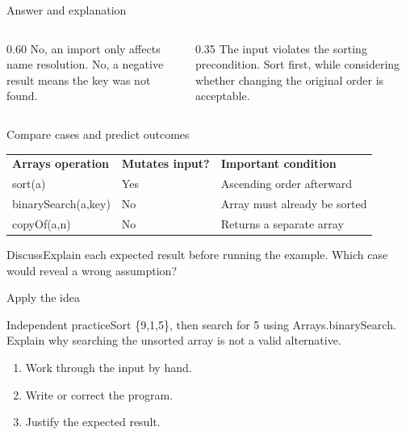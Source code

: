 \documentclass[10pt,aspectratio=169]{beamer}
\begin{document}
\begin{frame}[fragile,t]{Answer and explanation}
\begin{columns}[T,onlytextwidth]\begin{column}{0.60\textwidth}
No, an import only affects name resolution. No, a negative result means the key was not found.
\end{column}\begin{column}{0.35\textwidth}\small
The input violates the sorting precondition. Sort first, while considering whether changing the original order is acceptable.
\end{column}\end{columns}
\end{frame}


\begin{frame}[fragile,t]{Compare cases and predict outcomes}
\small\renewcommand{\arraystretch}{1.5}
\begin{tabularx}{\textwidth}{>{\raggedright\arraybackslash}X>{\raggedright\arraybackslash}X>{\raggedright\arraybackslash}X}\rowcolor{navy}
\color{white}\bfseries Arrays operation & \color{white}\bfseries Mutates input? & \color{white}\bfseries Important condition\\
sort(a) & Yes & Ascending order afterward\\
binarySearch(a,key) & No & Array must already be sorted\\
copyOf(a,n) & No & Returns a separate array\\
\end{tabularx}\par\vspace{3mm}\begin{exampleblock}{Discuss}Explain each expected result before running the example. Which case would reveal a wrong assumption?\end{exampleblock}
\end{frame}

\begin{frame}[fragile,t]{Apply the idea}
\begin{alertblock}{Independent practice}Sort \{9,1,5\}, then search for 5 using Arrays.binarySearch. Explain why searching the unsorted array is not a valid alternative.\end{alertblock}\vspace{3mm}\begin{enumerate}\item Work through the input by hand.\item Write or correct the program.\item Justify the expected result.\end{enumerate}
\end{frame}
\end{document}
